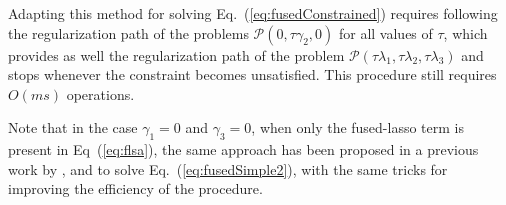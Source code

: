 \documentclass[twoside,11pt]{article}
\def\P{{\mathcal P}}
\begin{document}
Adapting this method for solving Eq.~(\ref{eq:fusedConstrained}) requires 
following the regularization path of the problems $\P(0,\tau\gamma_2,0)$ for
all values of $\tau$, which provides as well the regularization path of the problem
$\P(\tau\lambda_1,\tau\lambda_2,\tau\lambda_3)$ and stops whenever the constraint
becomes unsatisfied. This procedure still requires $O(ms)$ operations.

Note that in the case $\gamma_1=0$ and $\gamma_3=0$, when only the fused-lasso
term is present in Eq~(\ref{eq:flsa}), the same approach has been proposed in a
previous work by \citet{harchaoui}, and \citet{harchaoui2} to solve
Eq.~(\ref{eq:fusedSimple2}), with the same tricks for improving the efficiency
of the procedure.

\end{document}
